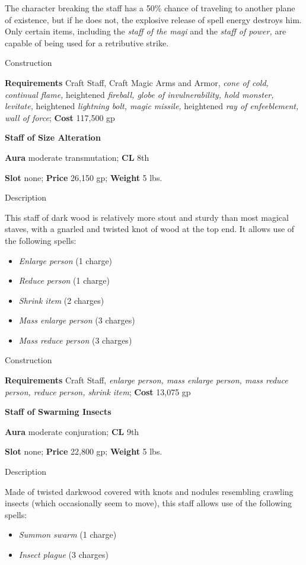 The character breaking the staff has a 50\% chance of traveling to another plane of existence, but if he does not, the explosive release of spell energy destroys him. Only certain items, including the \textit{staff of the magi} and the \textit{staff of power, }are capable of being used for a retributive strike.
				
Construction
				
\textbf{Requirements }Craft Staff, Craft Magic Arms and Armor, \textit{cone of cold, continual flame, }heightened \textit{fireball, globe of invulnerability, hold monster, levitate, }heightened \textit{lightning bolt, magic missile, }heightened \textit{ray of enfeeblement, wall of force}; \textbf{Cost} 117,500 gp
				
\textbf{Staff of Size Alteration}
				
\textbf{Aura} moderate transmutation; \textbf{CL} 8th
				
\textbf{Slot }none; \textbf{Price} 26,150 gp; \textbf{Weight} 5 lbs.
				
Description
				
This staff of dark wood is relatively more stout and sturdy than most magical staves, with a gnarled and twisted knot of wood at the top end. It allows use of the following spells:
				\begin{itemize}\item  \textit{Enlarge person} (1 charge)
				\item  \textit{Reduce person} (1 charge)
				\item  \textit{Shrink item} (2 charges)
				\item  \textit{Mass enlarge person} (3 charges)
				\item  \textit{Mass reduce person} (3 charges)
\end{itemize}
				
Construction
				
\textbf{Requirements }Craft Staff, \textit{enlarge person, mass enlarge person, mass reduce person, reduce person, shrink item}; \textbf{Cost} 13,075 gp
				
\textbf{Staff of Swarming Insects}
				
\textbf{Aura} moderate conjuration;\textbf{ CL }9th
				
\textbf{Slot} none; \textbf{Price} 22,800 gp; \textbf{Weight} 5 lbs.
				
Description
				
Made of twisted darkwood covered with knots and nodules resembling crawling insects (which occasionally seem to move), this staff allows use of the following spells:
				\begin{itemize}\item  \textit{Summon swarm} (1 charge)
				\item  \textit{Insect plague} (3 charges) 
\end{itemize}
				
